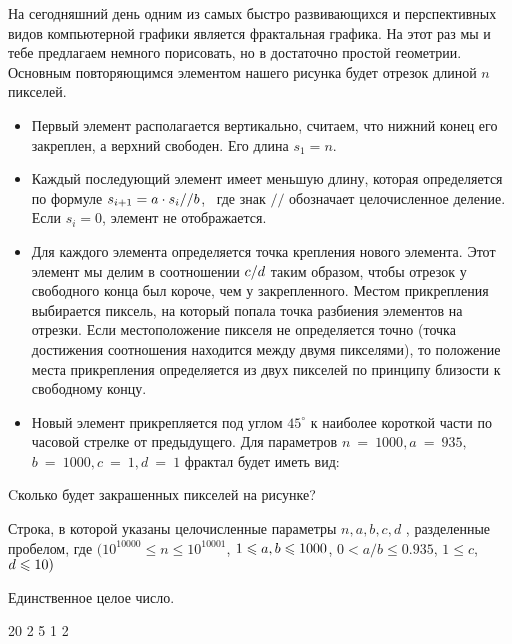 
На сегодняшний день одним из самых быстро развивающихся и перспективных видов компьютерной графики является фрактальная графика. 
На этот раз мы и тебе предлагаем немного порисовать, но в достаточно простой геометрии. Основным повторяющимся элементом нашего 
рисунка будет отрезок длиной $n$ пикселей. 

\begin{itemize}
    \item Первый элемент располагается вертикально, считаем, что нижний конец его закреплен, 
    а верхний свободен. Его длина $s_1 = n$. 
    \item Каждый последующий элемент имеет меньшую длину, которая определяется по формуле 
    $s_{i+1}=a \cdot s_i \space // \space b$,  где знак $//$ обозначает целочисленное деление. Если $s_i = 0$, элемент не отображается.
    \item Для каждого элемента определяется точка крепления нового элемента. Этот элемент мы 
    делим в соотношении $c \space / \space d$ таким образом, чтобы отрезок у свободного конца был короче, чем у закрепленного. 
    Местом прикрепления выбирается пиксель, на который попала точка разбиения элементов на отрезки. Если 
    местоположение пикселя не определяется точно (точка достижения соотношения находится между двумя пикселями), 
    то положение места прикрепления определяется из двух пикселей по принципу близости к свободному концу.
    \item Новый элемент прикрепляется под углом $45^{\circ}$ к наиболее короткой части по часовой стрелке от 
    предыдущего. Для параметров $n~=~1000, a~=~935,$ \linebreak $b~=~1000, c~=~1, d~=~1$  фрактал будет иметь вид:
\end{itemize}


Cколько будет закрашенных пикселей на рисунке?


Строка, в которой указаны целочисленные параметры $n, a, b, c, d$ , разделенные пробелом, где 
$(10^{10000} \leq n \leq 10^{10001}$, $1 \leq a,\space b \leq 1000$, $0 < a/b \leq  0.935$, 
$1 \leq c$, $\space d \leq 10 )$

\outputfmtSection

Единственное целое число.


\begin{myverbbox}[\small]{\vinput}
    20 2 5 1 2
\end{myverbbox}

